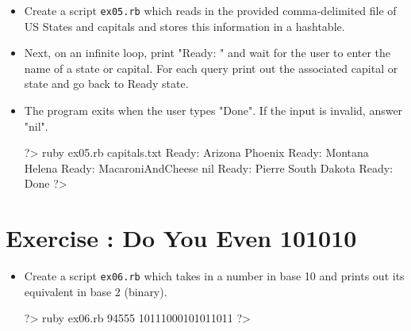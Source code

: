 \documentclass{42-en}
\begin{document}
\begin{itemize}

\item Create a script \texttt{ex05.rb} which reads in the provided comma-delimited file of US States and capitals and stores this information in a hashtable.
\item Next, on an infinite loop, print "Ready: " and wait for the user to enter the name of a state or capital. For each query print out the associated capital or state and go back to Ready state.
\item The program exits when the user types "Done". If the input is invalid, answer "nil".

\begin{42console}
	?> ruby ex05.rb capitals.txt
	Ready: Arizona
	Phoenix
	Ready: Montana
	Helena
	Ready: MacaroniAndCheese
	nil
	Ready: Pierre
	South Dakota
	Ready: Done
	?>
\end{42console}

\end{itemize}


\chapter{Exercise \exercicenumber: Do You Even 101010}

\exnumber{\exercicenumber}


\begin{itemize}

\item Create a script \texttt{ex06.rb} which takes in a number in base 10 and prints out its equivalent in base 2 (binary).

\begin{42console}
	?> ruby ex06.rb 94555
	10111000101011011
	?>
\end{42console}

\end{itemize}

\end{document}
